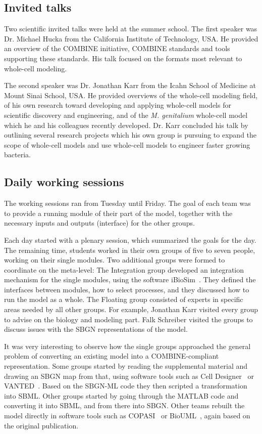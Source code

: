 \documentclass[journal,transmag]{IEEEtran}
\begin{document}
\subsection{Invited talks}
Two scientific invited talks were held at the summer school. 
The first speaker was Dr. Michael Hucka from the California Institute of Technology, USA. 
He provided an overview of the COMBINE initiative, COMBINE standards and tools supporting these standards. 
His talk focused on the formats most relevant to whole-cell modeling. 

The second speaker was Dr. Jonathan Karr from the Icahn School of Medicine at Mount Sinai School, USA. 
He provided overviews of the whole-cell modeling field, of his own research toward developing and applying whole-cell models for scientific discovery and engineering, and of the \textit{M. genitalium} whole-cell model which he and his colleagues recently developed.
Dr. Karr concluded his talk by outlining several research projects which his own group is pursuing to expand the scope of whole-cell models and use whole-cell models to engineer faster growing bacteria.

\subsection{Daily working sessions}
The working sessions ran from Tuesday until Friday. 
The goal of each team was to provide a running module of their part of the model, together with the necessary inputs and outputs (interface) for the other groups. 

Each day started with a plenary session, which summarized the goals for the day. 
The remaining time, students worked in their own groups of five to seven people, working on their single modules. 
Two additional groups were formed to coordinate on the meta-level: 
The Integration group developed an integration mechanism for the single modules, using the software iBioSim~\cite{Stevens2013}. 
They defined the interfaces between modules, how to select processes, and they discussed how to run the model as a whole.
The Floating group consisted of experts in specific areas needed by all other groups.
For example, Jonathan Karr visited every group to advise on the biology and modeling part. 
Falk Schreiber visited the groups to discuss issues with the SBGN representations of the model. 

It was very interesting to observe how the single groups approached the general problem of converting an existing model into a COMBINE-compliant representation. 
Some groups started by reading the supplemental material and drawing an SBGN map from that, using software tools such as Cell Designer~\cite{funahashi2008celldesigner} or VANTED~\cite{Rohn2012}. 
Based on the SBGN-ML code they then scripted a transformation into SBML. 
Other groups started by going through the MATLAB code and converting it into SBML, and from there into SBGN. 
Other teams rebuilt the model directly in software tools such as COPASI~\cite{Mendes2009} or BioUML~\cite{Kolpakov2006}, again based on the original publication.
\end{document}
